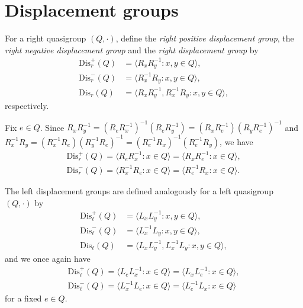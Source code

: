 \documentclass{amsart}
\theoremstyle{plain}
\theoremstyle{definition}
\begin{document}
\section{Displacement groups}

For a right quasigroup $(Q,\cdot)$, define the \emph{right positive displacement group}, the \emph{right negative displacement group} and the \emph{right displacement group} by
\begin{align*}
    \mathrm{Dis}_r^+(Q) &=\langle R_xR_y^{-1}:x,y\in Q\rangle,\\
    \mathrm{Dis}_r^-(Q) &=\langle R_x^{-1}R_y:x,y\in Q\rangle,\\
    \mathrm{Dis}_r(Q) &= \langle R_xR_y^{-1},R_x^{-1}R_y:x,y\in Q\rangle,
\end{align*}
respectively.

Fix $e\in Q$. Since $R_xR_y^{-1} = (R_eR_x^{-1})^{-1}(R_eR_y^{-1}) = (R_xR_e^{-1})(R_yR_e^{-1})^{-1}$ and $R_x^{-1}R_y=(R_x^{-1}R_e)(R_y^{-1}R_e)^{-1} = (R_e^{-1}R_x)^{-1}(R_e^{-1}R_y)$, we have
\begin{align*}
    \mathrm{Dis}_r^+(Q)=\langle R_eR_x^{-1}:x\in Q\rangle = \langle R_xR_e^{-1}:x\in Q\rangle,\\
    \mathrm{Dis}_r^-(Q)=\langle R_x^{-1}R_e:x\in Q\rangle = \langle R_e^{-1}R_x:x\in Q\rangle.
\end{align*}

The left displacement groups are defined analogously for a left quasigroup $(Q,\cdot)$ by
\begin{align*}
    \mathrm{Dis}_\ell^+(Q) &=\langle L_xL_y^{-1}:x,y\in Q\rangle,\\
    \mathrm{Dis}_\ell^-(Q) &=\langle L_x^{-1}L_y:x,y\in Q\rangle,\\
    \mathrm{Dis}_\ell(Q) &= \langle L_xL_y^{-1},L_x^{-1}L_y:x,y\in Q\rangle,
\end{align*}
and we once again have
\begin{align*}
    \mathrm{Dis}_\ell^+(Q)=\langle L_eL_x^{-1}:x\in Q\rangle = \langle L_xL_e^{-1}:x\in Q\rangle,\\
    \mathrm{Dis}_\ell^-(Q)=\langle L_x^{-1}L_e:x\in Q\rangle = \langle L_e^{-1}L_x:x\in Q\rangle
\end{align*}
for a fixed $e\in Q$.
\end{document}
